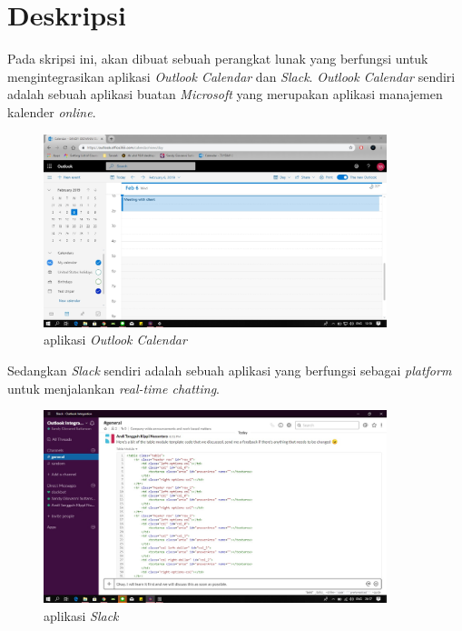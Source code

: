 \documentclass[a4paper,twoside]{article}
\begin{document}
\title{\@judultopik}
\author{\nama \textendash \@npm} 

\newcommand{\nama}{Sandy Giovanni S.}
\newcommand{\@npm}{2015730041}
\newcommand{\@judultopik}{Integrasi \textit{Outlook Calendar} dan \textit{Slack}} %
\newcommand{\jumpemb}{1} %
\newcommand{\tanggal}{07/02/2019}


\maketitle


\section{Deskripsi}
Pada skripsi ini, akan dibuat sebuah perangkat lunak yang berfungsi untuk mengintegrasikan aplikasi \textit{Outlook Calendar} dan \textit{Slack}.\textit{ Outlook Calendar} sendiri adalah sebuah aplikasi buatan \textit{Microsoft} yang merupakan aplikasi manajemen kalender \textit{online}. 

\begin{figure}[h]
  \includegraphics[width=10cm]{img/outlookcalendar.jpg}
  \centering
  \caption{aplikasi \textit{Outlook Calendar}}
\end{figure}

Sedangkan \textit{Slack} sendiri adalah sebuah aplikasi yang berfungsi sebagai \textit{platform} untuk menjalankan \textit{real-time chatting}. 

\begin{figure}[h]
  \includegraphics[width=10cm]{img/slack_chat_2.jpg}
  \centering
  \caption{aplikasi \textit{Slack}}
\end{figure}
\end{document}
